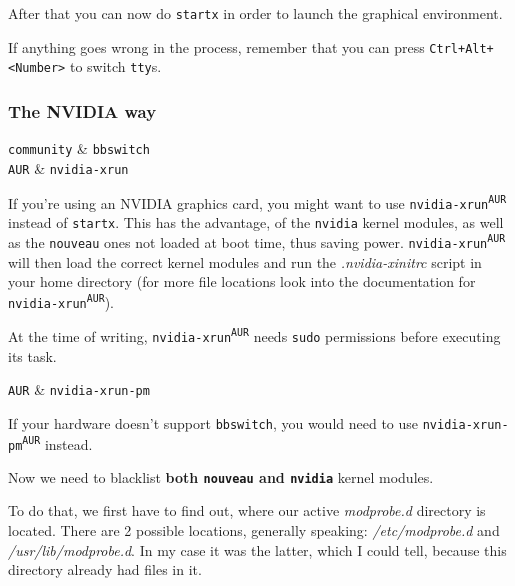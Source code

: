 \documentclass[10pt]{dustdoc}
\begin{document}
After that you can now do \texttt{startx} in order to launch the graphical environment.

If anything goes wrong in the process, remember that you can press \texttt{Ctrl+\allowbreak{}Alt+\allowbreak{}<Number>} to switch \texttt{tty}s.

\subsubsection{The NVIDIA way}
\label{sec:the-nvidia-way}

\begin{packagetable}
    \texttt{community} & \texttt{bbswitch} \\
    \texttt{AUR} & \texttt{nvidia-xrun} \\
\end{packagetable}

If you’re using an NVIDIA graphics card, you might want to use \texttt{nvidia-xrun\textsuperscript{\texttt{AUR}}} instead of \texttt{startx}.
This has the advantage, of the \texttt{nvidia} kernel modules, as well as the \texttt{nouveau} ones not loaded at boot time, thus saving power.
\texttt{nvidia-xrun\textsuperscript{\texttt{AUR}}} will then load the correct kernel modules and run the \textit{.nvidia-xinitrc} script in your home directory (for more file locations look into the documentation for \texttt{nvidia-xrun\textsuperscript{\texttt{AUR}}}).

\begin{IMPORTANT}
    At the time of writing, \texttt{nvidia-xrun\textsuperscript{\texttt{AUR}}} needs \texttt{sudo} permissions before executing its task.
\end{IMPORTANT}

\begin{NOTE}
    \begin{packagetable}
        \texttt{AUR} & \texttt{nvidia-xrun-pm} \\
    \end{packagetable}

    If your hardware doesn’t support \texttt{bbswitch}, you would need to use \texttt{nvidia-xrun-pm\textsuperscript{\texttt{AUR}}} instead.
\end{NOTE}

Now we need to blacklist \textbf{both \texttt{nouveau} and \texttt{nvidia}} kernel modules.

To do that, we first have to find out, where our active \textit{modprobe.d} directory is located.
There are 2 possible locations, generally speaking: \textit{/etc/modprobe.d} and \textit{/usr/lib/modprobe.d}.
In my case it was the latter, which I could tell, because this directory already had files in it.
\end{document}
